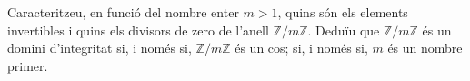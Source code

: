 Caracteritzeu, en funció del nombre enter $m > 1$, quins són els elements invertibles i quins els divisors de zero de l'anell $\mathbb{Z} / m\mathbb{Z}$. Deduïu que $\mathbb{Z} / m\mathbb{Z}$ és un domini d'integritat si, i només si, $\mathbb{Z} / m\mathbb{Z}$ és un cos; si, i només si, $m$ és un nombre primer.